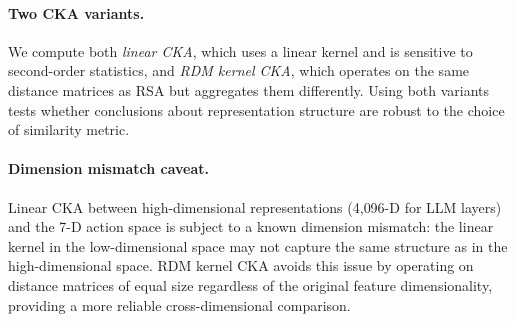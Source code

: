 \paragraph{Two CKA variants.}
We compute both \emph{linear CKA}, which uses a linear kernel and is sensitive to second-order statistics, and \emph{RDM kernel CKA}, which operates on the same distance matrices as RSA but aggregates them differently.
Using both variants tests whether conclusions about representation structure are robust to the choice of similarity metric.

\paragraph{Dimension mismatch caveat.}
Linear CKA between high-dimensional representations (4{,}096-D for LLM layers) and the 7-D action space is subject to a known dimension mismatch: the linear kernel in the low-dimensional space may not capture the same structure as in the high-dimensional space.
RDM kernel CKA avoids this issue by operating on distance matrices of equal size regardless of the original feature dimensionality, providing a more reliable cross-dimensional comparison.
